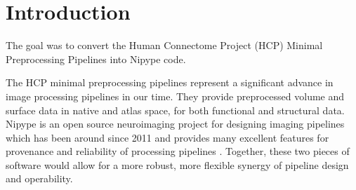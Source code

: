\documentclass[twocolumn]{bmcart}%
\begin{document}
\begin{frontmatter}
\begin{fmbox}

	








%
\end{fmbox}%

\end{frontmatter}


\section{Introduction}\label{introduction}

The goal was to convert the Human Connectome Project (HCP) Minimal
Preprocessing Pipelines into Nipype code.

The HCP minimal preprocessing pipelines \cite{Glasser2013} represent a
significant advance in image processing pipelines in our time. They
provide preprocessed volume and surface data in native and atlas space,
for both functional and structural data. Nipype is an open source
neuroimaging project for designing imaging pipelines which has been
around since 2011 and provides many excellent features for provenance
and reliability of processing pipelines \cite{Gorgolewski2011}.
Together, these two pieces of software would allow for a more robust,
more flexible synergy of pipeline design and operability.
\end{document}
